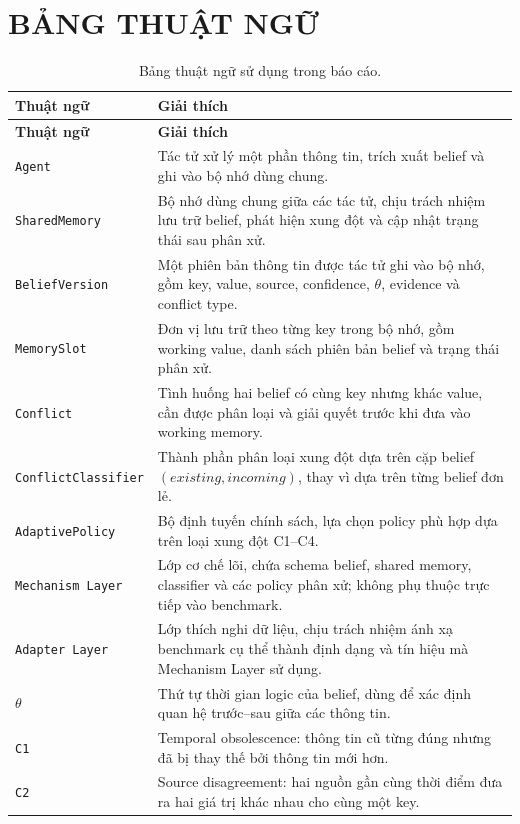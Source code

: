 \documentclass[12pt,a4paper]{article}
\newcommand{\code}[1]{\texttt{#1}}
\begin{document}
\newpage
\section*{BẢNG THUẬT NGỮ}

\begin{longtable}{p{}p{}}
\caption{Bảng thuật ngữ sử dụng trong báo cáo.}\label{tab:glossary}\\
\toprule
\textbf{Thuật ngữ} & \textbf{Giải thích} \\
\midrule
\endfirsthead
\toprule
\textbf{Thuật ngữ} & \textbf{Giải thích} \\
\midrule
\endhead
\code{Agent} & Tác tử xử lý một phần thông tin, trích xuất belief và ghi vào bộ nhớ dùng chung. \\
\code{SharedMemory} & Bộ nhớ dùng chung giữa các tác tử, chịu trách nhiệm lưu trữ belief, phát hiện xung đột và cập nhật trạng thái sau phân xử. \\
\code{BeliefVersion} & Một phiên bản thông tin được tác tử ghi vào bộ nhớ, gồm key, value, source, confidence, \(\theta\), evidence và conflict type. \\
\code{MemorySlot} & Đơn vị lưu trữ theo từng key trong bộ nhớ, gồm working value, danh sách phiên bản belief và trạng thái phân xử. \\
\code{Conflict} & Tình huống hai belief có cùng key nhưng khác value, cần được phân loại và giải quyết trước khi đưa vào working memory. \\
\code{ConflictClassifier} & Thành phần phân loại xung đột dựa trên cặp belief \((existing, incoming)\), thay vì dựa trên từng belief đơn lẻ. \\
\code{AdaptivePolicy} & Bộ định tuyến chính sách, lựa chọn policy phù hợp dựa trên loại xung đột C1--C4. \\
\code{Mechanism Layer} & Lớp cơ chế lõi, chứa schema belief, shared memory, classifier và các policy phân xử; không phụ thuộc trực tiếp vào benchmark. \\
\code{Adapter Layer} & Lớp thích nghi dữ liệu, chịu trách nhiệm ánh xạ benchmark cụ thể thành định dạng và tín hiệu mà Mechanism Layer sử dụng. \\
\(\theta\) & Thứ tự thời gian logic của belief, dùng để xác định quan hệ trước--sau giữa các thông tin. \\
\code{C1} & Temporal obsolescence: thông tin cũ từng đúng nhưng đã bị thay thế bởi thông tin mới hơn. \\
\code{C2} & Source disagreement: hai nguồn gần cùng thời điểm đưa ra hai giá trị khác nhau cho cùng một key. \\

\end{longtable}
\end{document}
